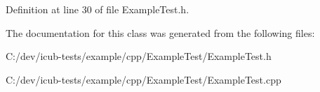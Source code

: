 Definition at line 30 of file Example\+Test.\+h.



The documentation for this class was generated from the following files\+:\begin{DoxyCompactItemize}
\item 
C\+:/dev/icub-\/tests/example/cpp/\+Example\+Test/Example\+Test.\+h\item 
C\+:/dev/icub-\/tests/example/cpp/\+Example\+Test/Example\+Test.\+cpp\end{DoxyCompactItemize}
